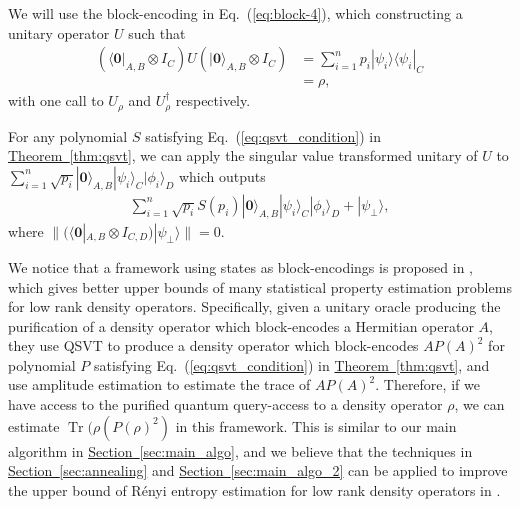 \documentclass[journal]{IEEEtran}
\newcommand{\eq}[1]{Eq.~(\ref{eq:#1})}
\newcommand{\thm}[1]{\hyperref[thm:#1]{Theorem~\ref*{thm:#1}}}
\renewcommand{\sec}[1]{\hyperref[sec:#1]{Section~\ref*{sec:#1}}}
\def\Tr{\operatorname{Tr}}\def\atanh{\operatorname{atanh}}\def\:{\hbox{\bf:}}
\begin{document}
We will use the block-encoding in \eq{block-4}, which constructing a unitary operator $U$ such that
\begin{align}
  (\langle\mathbf{0}|_{A,B}\otimes I_C)U(|\mathbf{0}\rangle_{A,B}\otimes I_C) &= \sum_{i=1}^n p_i|\psi_i\rangle\langle \psi_i|_C \nonumber\\&= \rho,
\end{align}
with one call to $U_\rho$ and $U_\rho^{\dagger}$ respectively. 

For any polynomial $S$ satisfying \eq{qsvt_condition} in \thm{qsvt}, we can apply the singular value transformed unitary of $U$ to $\sum_{i=1}^n\sqrt{p_i}|\mathbf{0}\rangle_{A,B}|\psi_i\rangle_C|\phi_i\rangle_D$ which outputs \begin{align}
    \sum_{i=1}^n\sqrt{p_i}S(p_i)|\mathbf{0}\rangle_{A,B}|\psi_i\rangle_C|\phi_i\rangle_D + |\psi_{\perp}\rangle,
\end{align}
where $\|(\langle\mathbf{0}|_{A,B}\otimes I_{C,D})|\psi_{\perp}\rangle\| = 0$. 

\iffalse
We notice that a framework using states as block-encodings is proposed in \cite{wang2022new}, which gives better upper bounds of many statistical property estimation problems for low rank density operators. Specifically, given a unitary oracle producing the purification of a density operator which block-encodes a Hermitian operator $A$, they use QSVT to produce a density operator which block-encodes $AP(A)^2$ for polynomial $P$ satisfying \eq{qsvt_condition} in \thm{qsvt}, and use amplitude estimation to estimate the trace of $AP(A)^2$.  Therefore, if we have access to the purified quantum query-access to a density operator $\rho$, we can estimate $\Tr(\rho(P(\rho)^2)$ in this framework. This is similar to our main algorithm in \sec{main_algo}, and we believe that the techniques in \sec{annealing} and \sec{main_algo_2} can be applied to improve the upper bound of R{\'e}nyi entropy estimation for low rank density operators in \cite{wang2022new}.
\end{document}
